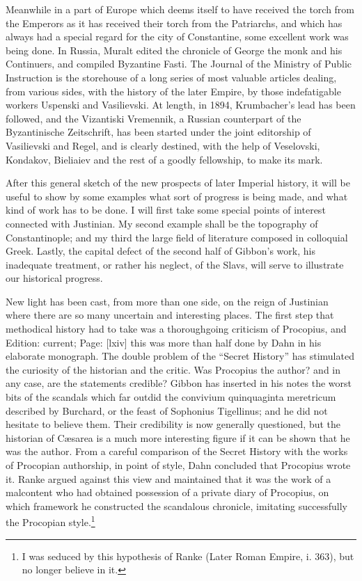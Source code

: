 Meanwhile in a part of Europe which deems itself to have received the torch from the Emperors as it has received their torch from the Patriarchs, and which has always had a special regard for the city of Constantine, some excellent work was being done. In Russia, Muralt edited the chronicle of George the monk and his Continuers, and compiled Byzantine Fasti. The Journal of the Ministry of Public Instruction is the storehouse of a long series of most valuable articles dealing, from various sides, with the history of the later Empire, by those indefatigable workers Uspenski and Vasilievski. At length, in 1894, Krumbacher\texthebrew{}’s lead has been followed, and the Vizantiski Vremennik, a Russian counterpart of the Byzantinische Zeitschrift, has been started under the joint editorship of Vasilievski and Regel, and is clearly destined, with the help of Veselovski, Kondakov, Bieliaiev and the rest of a goodly fellowship, to make its mark.

After this general sketch of the new prospects of later Imperial history, it will be useful to show by some examples what sort of progress is being made, and what kind of work has to be done. I will first take some special points of interest connected with Justinian. My second example shall be the topography of Constantinople; and my third the large field of literature composed in colloquial Greek. Lastly, the capital defect of the second half of Gibbon\texthebrew{}’s work, his inadequate treatment, or rather his neglect, of the Slavs, will serve to illustrate our historical progress.

New light has been cast, from more than one side, on the reign of Justinian where there are so many uncertain and interesting places. The first step that methodical history had to take was a thoroughgoing criticism of Procopius, and Edition: current; Page: [lxiv] this was more than half done by Dahn in his elaborate monograph. The double problem of the \texthebrew{“}Secret History\texthebrew{}” has stimulated the curiosity of the historian and the critic. Was Procopius the author? and in any case, are the statements credible? Gibbon has inserted in his notes the worst bits of the scandals which far outdid the convivium quinquaginta meretricum described by Burchard, or the feast of Sophonius Tigellinus; and he did not hesitate to believe them. Their credibility is now generally questioned, but the historian of Cæsarea is a much more interesting figure if it can be shown that he was the author. From a careful comparison of the Secret History with the works of Procopian authorship, in point of style, Dahn concluded that Procopius wrote it. Ranke argued against this view and maintained that it was the work of a malcontent who had obtained possession of a private diary of Procopius, on which framework he constructed the scandalous chronicle, imitating successfully the Procopian style.\footnote{I was seduced by this hypothesis of Ranke (Later Roman Empire, i. 363), but no longer believe in it.}


